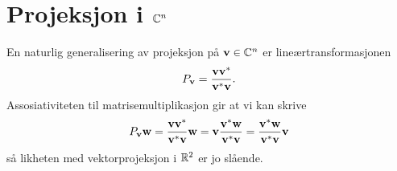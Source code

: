  \section*{Projeksjon i $\mathbb{C}^n$}
% 
% 
% 
% 
%
% 
%
%
%
%
%
 
En naturlig generalisering av  projeksjon på $\mathbf{v} \in \mathbb{C}^n$ er lineærtransformasjonen
 \[
 P_{\mathbf{v}}=\frac{\mathbf{v} \mathbf{v}^*}{\mathbf{v}^* \mathbf{v}}.
 \]
Assosiativiteten til matrisemultiplikasjon gir at vi kan skrive
 \[
 P_{\mathbf{v}}\mathbf{w}=\frac{\mathbf{v} \mathbf{v}^*}{\mathbf{v}^* \mathbf{v}} \mathbf{w}=\mathbf{v} \frac{ \mathbf{v}^*\mathbf{w}}{\mathbf{v}^* \mathbf{v}}=\frac{ \mathbf{v}^*\mathbf{w}}{\mathbf{v}^* \mathbf{v}} \mathbf{v} 
 \]
 så likheten med vektorprojeksjon i $\mathbb{R}^2$ er jo slående. %

